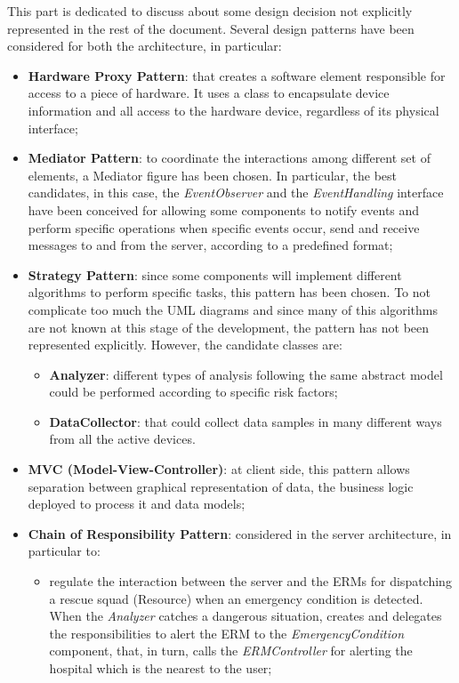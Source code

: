 \begin{flushleft}
{}
{\setlength{\parskip}{0.3cm}
This part is dedicated to discuss about some design decision not explicitly represented in the rest of the document.
Several design patterns have been considered for both the architecture, in particular:
\begin{itemize}
	\item \textbf{Hardware Proxy Pattern}: that creates a software element responsible for access to a piece of hardware. It uses a class to encapsulate device information and all access to the hardware device, regardless of its physical interface;
	\item \textbf{Mediator Pattern}: to coordinate the interactions among different set of elements, a Mediator figure has been chosen. In particular, the best candidates, in this case, the \textit{EventObserver} and the \textit{EventHandling} interface have been conceived for allowing some components to notify events and perform specific operations when specific events occur, send and receive messages to and from the server, according to a predefined format;
	\item \textbf{Strategy Pattern}: since some components will implement different algorithms to perform specific tasks, this pattern has been chosen. To not complicate too much the UML diagrams and since many of this algorithms are not known at this stage of the development, the pattern has not been represented explicitly. However, the candidate classes are:
	\begin{itemize}
		\item \textbf{Analyzer}: different types of analysis following the same abstract model could be performed according to specific risk factors;
		\item \textbf{DataCollector}: that could collect data samples in many different ways from all the active devices.
	\end{itemize}
	\item \textbf{MVC (Model-View-Controller)}: at client side, this pattern allows separation between graphical representation of data, the business logic deployed to process it and data models;
	\item \textbf{Chain of Responsibility Pattern}: considered in the server architecture, in particular to:
	\begin{itemize}
		\item  regulate the interaction between the server and the ERMs for dispatching a rescue squad (Resource) when an emergency condition is detected. When the \textit{Analyzer} catches a dangerous situation, creates and delegates the responsibilities to alert the ERM to the \textit{EmergencyCondition} component, that, in turn, calls the \textit{ERMController} for alerting the hospital which is the nearest to the user;

\end{itemize}
\end{itemize}}
\end{flushleft}
